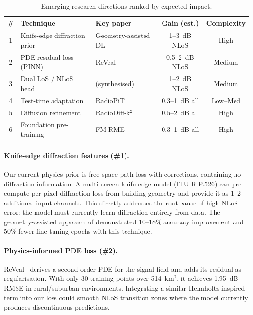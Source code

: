 \documentclass[11pt,a4paper]{article}
\begin{document}
\begin{table}[h!]
\centering
\caption{Emerging research directions ranked by expected impact.}
\label{tab:emerging}
\small
\begin{tabularx}{\textwidth}{clXcc}
\toprule
\textbf{\#} & \textbf{Technique} & \textbf{Key paper} & \textbf{Gain (est.)} & \textbf{Complexity} \\
\midrule
1 & Knife-edge diffraction prior & Geometry-assisted DL \cite{geomDL2024} & 1--3~dB NLoS & High \\
2 & PDE residual loss (PINN) & ReVeal \cite{reveal2025} & 0.5--2~dB NLoS & Medium \\
3 & Dual LoS / NLoS head & (synthesised) & 1--2~dB NLoS & Medium \\
4 & Test-time adaptation & RadioPiT \cite{radiopit2025} & 0.3--1~dB all & Low--Med \\
5 & Diffusion refinement & RadioDiff-k$^2$ \cite{radiodiff2025} & 0.5--2~dB all & High \\
6 & Foundation pre-training & FM-RME \cite{fmrme2026} & 0.3--1~dB all & High \\
\bottomrule
\end{tabularx}
\end{table}

\paragraph{Knife-edge diffraction features (\#1).}
Our current physics prior is free-space path loss with corrections, containing
no diffraction information. A multi-screen knife-edge model (ITU-R P.526) can
pre-compute per-pixel diffraction loss from building geometry and provide it as
1--2 additional input channels. This directly addresses the root cause of high
NLoS error: the model must currently learn diffraction entirely from data.
The geometry-assisted approach of \cite{geomDL2024} demonstrated 10--18\%
accuracy improvement and 50\% fewer fine-tuning epochs with this technique.

\paragraph{Physics-informed PDE loss (\#2).}
ReVeal~\cite{reveal2025} derives a second-order PDE for the signal field and
adds its residual as regularisation. With only 30 training points over 514~km$^2$,
it achieves 1.95~dB RMSE in rural/suburban environments. Integrating a similar
Helmholtz-inspired term into our loss could smooth NLoS transition zones where
the model currently produces discontinuous predictions.
\end{document}
